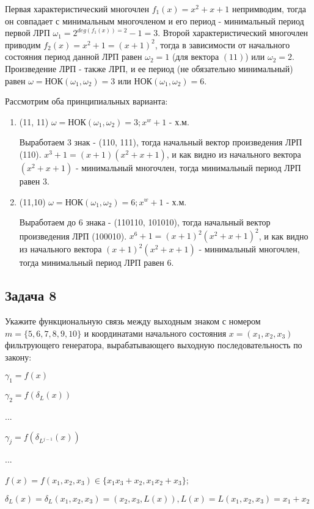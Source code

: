\documentclass[utf8x, 14pt]{G7-32} %
\begin{document}
Первая характеристический многочлен $f_1(x)=x^2+x+1$ непримводим, тогда он совпадает с минимальным многочленом и его период - минимальный период первой ЛРП $\omega_1 = 2^{deg(f_1(x))=2} -1 = 3$. Второй характеристический многочлен приводим $f_2(x)=x^2+1 = (x+1)^2$, тогда в зависимости от начального состояния период данной ЛРП равен $\omega_2 = 1$ (для вектора $(11)$) или $\omega_2 = 2$. Произведение ЛРП - также ЛРП, и ее период (не обязательно минимальный) равен $\omega = $НОК$(\omega_1,\omega_2) = 3$ или НОК$(\omega_1,\omega_2) = 6$.

Рассмотрим оба принципиальных варианта:
\begin{enumerate}
    \item (11, 11)
    $\omega = $НОК$(\omega_1,\omega_2) = 3; x^w+1$ - х.м.
    
    Выработаем 3 знак - (110, 111), тогда начальный вектор произведения ЛРП (110). $x^3+1 = (x+1)(x^2+x+1)$, и как видно из начального вектора $(x^2+x+1)$ - минимальный многочлен, тогда минимальный период ЛРП равен 3.
    \item (11,10)
    $\omega = $НОК$(\omega_1,\omega_2) = 6; x^w+1$ - х.м.
    
    Выработаем до 6 знака - (110110, 101010), тогда начальный вектор произведения ЛРП (100010). $x^6+1 = (x+1)^2(x^2+x+1)^2$, и как видно из начального вектора $(x+1)^2(x^2+x+1)$ - минимальный многочлен, тогда минимальный период ЛРП равен 6.
\end{enumerate}

\subsection{Задача 8}
Укажите функциональную связь между выходным знаком с номером $m = \{5,6,7,8,9,10\}$ и координатами начального состояния $x=(x_1,x_2,x_3)$ фильтрующего генератора, вырабатывающего выходную последовательность по закону: 

$\gamma_1 = f(x)$

$\gamma_2=f(\delta_L(x))$

...

$\gamma_j=f(\delta_{L^{j-1}}(x))$

...

$f(x)=f(x_1,x_2,x_3)\in\{x_1 x_3+x_2, x_1 x_2+x_3\}$;

$\delta_L(x)=\delta_L(x_1,x_2,x_3)=(x_2,x_3,L(x)), L(x)=L(x_1,x_2,x_3)= x_1+x_2$
\end{document}
